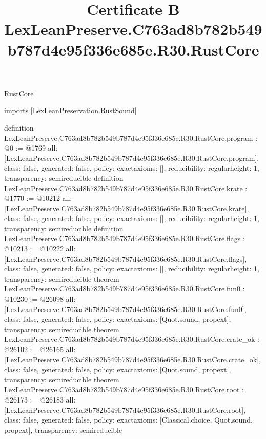 \begin{lexlean}{RustCore}
\title{Certificate B LexLeanPreserve.C763ad8b782b549b787d4e95f336e685e.R30.RustCore}
\begin{coremodule}
imports [LexLeanPreservation.RustSound]

definition LexLeanPreserve.C763ad8b782b549b787d4e95f336e685e.R30.RustCore.program : @0 := @1769 {
  all: [LexLeanPreserve.C763ad8b782b549b787d4e95f336e685e.R30.RustCore.program],
  class: false,
  generated: false,
  policy: exact{axioms: []},
  reducibility: regular{height: 1},
  transparency: semireducible
}
definition LexLeanPreserve.C763ad8b782b549b787d4e95f336e685e.R30.RustCore.krate : @1770 := @10212 {
  all: [LexLeanPreserve.C763ad8b782b549b787d4e95f336e685e.R30.RustCore.krate],
  class: false,
  generated: false,
  policy: exact{axioms: []},
  reducibility: regular{height: 1},
  transparency: semireducible
}
definition LexLeanPreserve.C763ad8b782b549b787d4e95f336e685e.R30.RustCore.flags : @10213 := @10222 {
  all: [LexLeanPreserve.C763ad8b782b549b787d4e95f336e685e.R30.RustCore.flags],
  class: false,
  generated: false,
  policy: exact{axioms: []},
  reducibility: regular{height: 1},
  transparency: semireducible
}
theorem LexLeanPreserve.C763ad8b782b549b787d4e95f336e685e.R30.RustCore.fun0 : @10230 := @26098 {
  all: [LexLeanPreserve.C763ad8b782b549b787d4e95f336e685e.R30.RustCore.fun0],
  class: false,
  generated: false,
  policy: exact{axioms: [Quot.sound, propext]},
  transparency: semireducible
}
theorem LexLeanPreserve.C763ad8b782b549b787d4e95f336e685e.R30.RustCore.crate_ok : @26102 := @26165 {
  all: [LexLeanPreserve.C763ad8b782b549b787d4e95f336e685e.R30.RustCore.crate_ok],
  class: false,
  generated: false,
  policy: exact{axioms: [Quot.sound, propext]},
  transparency: semireducible
}
theorem LexLeanPreserve.C763ad8b782b549b787d4e95f336e685e.R30.RustCore.root : @26173 := @26183 {
  all: [LexLeanPreserve.C763ad8b782b549b787d4e95f336e685e.R30.RustCore.root],
  class: false,
  generated: false,
  policy: exact{axioms: [Classical.choice, Quot.sound, propext]},
  transparency: semireducible
}


\end{coremodule}
\end{lexlean}
